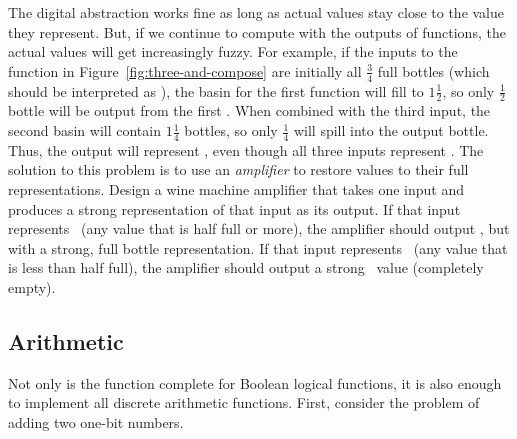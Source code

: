 \begin{schemeregion}
\beforesplitex
\begin{exercise} \goldstar \label{ex:amplifier}
The digital abstraction works fine as long as actual values stay close to the value they represent.  But, if we continue to compute with the outputs of functions, the actual values will get increasingly fuzzy.  For example, if the inputs to the  function in Figure~\ref{fig:three-and-compose} are initially all $\frac{3}{4}$ full bottles (which should be interpreted as \true), the basin for the first  function will fill to $1\frac{1}{2}$, so only $\frac{1}{2}$ bottle will be output from the first .  When combined with the third input, the second basin will contain $1\frac{1}{4}$ bottles, so only $\frac{1}{4}$ will spill into the output bottle.  Thus, the output will represent \false, even though all three inputs represent \true.  The solution to this problem is to use an \emph{amplifier} to restore values to their full representations.  Design a wine machine amplifier that takes one input and produces a strong representation of that input as its output.  If that input represents \true\ (any value that is half full or more), the amplifier should output \true, but with a strong, full bottle representation.  If that input represents \false\ (any value that is less than half full), the amplifier should output a strong \false\ value (completely empty).  
\end{exercise}
\aftersplitex


\subsection{Arithmetic}\label{sec:binaryarithmetic}

Not only is the  function complete for Boolean logical functions, it is also enough to implement all discrete arithmetic functions.  
First, consider the problem of adding two one-bit numbers.  



\end{schemeregion}
